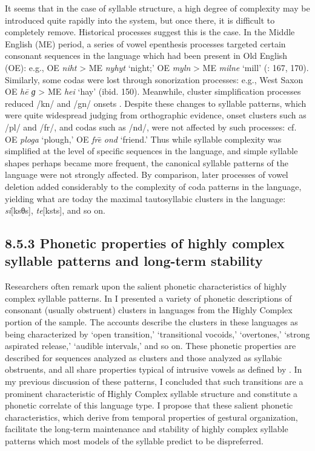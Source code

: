   It seems that in the case of syllable structure, a high degree of complexity may be introduced quite rapidly into the system, but once there, it is difficult to completely remove. Historical processes suggest this is the case. In the Middle English (ME) period, a series of vowel epenthesis processes targeted certain consonant sequences in the language which had been present in Old English (OE): e.g., OE \textit{niht} > ME \textit{nyhyt} ‘night;’ OE \textit{myln} > ME \textit{milne} ‘mill’ (\citealt{Jones1989}: 167, 170). Similarly, some codas were lost through sonorization processes: e.g., West Saxon OE \textit{he\={} ɡ} > ME \textit{hei} ‘hay’ (ibid. 150). Meanwhile, cluster simplification processes reduced /kn/ and /gn/ onsets \citep{Minkova2003}. Despite these changes to syllable patterns, which were quite widespread judging from orthographic evidence, onset clusters such as /pl/ and /fr/, and codas such as /nd/, were not affected by such processes: cf. OE \textit{ploga} ‘plough,’ OE \textit{fre}\textsf{\={} }\textit{ond} ‘friend.’ Thus while syllable complexity was simplified at the level of specific sequences in the language, and simple syllable shapes perhaps became more frequent, the canonical syllable patterns of the language were not strongly affected. By comparison, later processes of vowel deletion added considerably to the complexity of coda patterns in the language, yielding what are today the maximal tautosyllabic clusters in the language: \textit{si}[ksθs], \textit{te}[ksts], and so on.

\subsection{8.5.3 Phonetic properties of highly complex syllable patterns and long-term stability}

  Researchers often remark upon the salient phonetic characteristics of highly complex syllable patterns. In  I presented a variety of phonetic descriptions of consonant (usually obstruent) clusters in languages from the Highly Complex portion of the sample. The accounts describe the clusters in these languages as being characterized by ‘open transition,’ ‘transitional vocoids,’ ‘overtones,’ ‘strong aspirated release,’ ‘audible intervals,’ and so on. These phonetic properties are described for sequences analyzed as clusters and those analyzed as syllabic obstruents, and all share properties typical of intrusive vowels as defined by \citet{Hall2006}. In my previous discussion of these patterns, I concluded that such transitions are a prominent characteristic of Highly Complex syllable structure and constitute a phonetic correlate of this language type. I propose that these salient phonetic characteristics, which derive from temporal properties of gestural organization, facilitate the long-term maintenance and stability of highly complex syllable patterns which most models of the syllable predict to be dispreferred.

